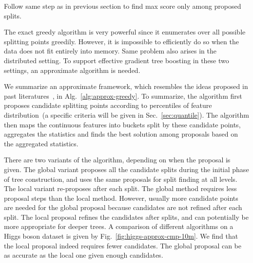 \begin{algorithm}[t]
    \caption{Approximate Algorithm for Split Finding}\label{alg:approx-greedy}
      Follow same step as in previous section to find max score only among proposed splits.\\
\end{algorithm}

The exact greedy algorithm is very powerful since it enumerates over all possible splitting points greedily. However, it is impossible to efficiently  do so when the data does not fit entirely into memory. Same problem also arises in the distributed setting. To support effective gradient tree boosting in these two settings, an approximate algorithm is needed.

We summarize an approximate framework, which resembles the ideas proposed in past literatures~\cite{McRank,Bekkerman:Scale,tyree2011parallel}, in Alg.~\ref{alg:approx-greedy}.
To summarize, the algorithm  first proposes candidate splitting points according to percentiles of feature distribution~(a specific criteria will be given in Sec.~\ref{sec:quantile}).
The algorithm then maps the continuous features into buckets split by these candidate points, aggregates the statistics and finds the best solution among proposals based on the aggregated statistics.

There are two variants of the algorithm, depending on when the proposal is given. The global variant  proposes all the candidate splits during the initial phase of tree construction, and uses the same proposals for split finding at all levels. The local variant  re-proposes after each split. The global method requires less proposal steps than the local method. However, usually more candidate points are needed for the global proposal because candidates are not refined after each split. The local proposal refines the candidates after splits, and can potentially be more appropriate for deeper trees. A comparison of different algorithms on a Higgs boson dataset is given by Fig.~\ref{fig:higgs-approx-cmp-10m}.
We find that the local proposal indeed requires fewer candidates. The global proposal can be as accurate as the local one given enough candidates.

